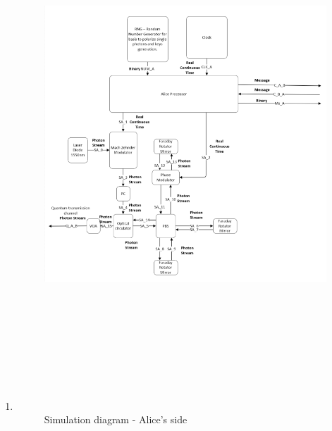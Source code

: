 \begin{enumerate}
  \item

  \begin{figure}[h]
	\centering
	\includegraphics[width=1.3\textwidth, height=20cm]{./sdf/qokd_with_discrete_variables/figures/Simulation_Alice.png}
	\caption{Simulation diagram - Alice's side}\label{simulationalice}
\end{figure}


\end{enumerate}
